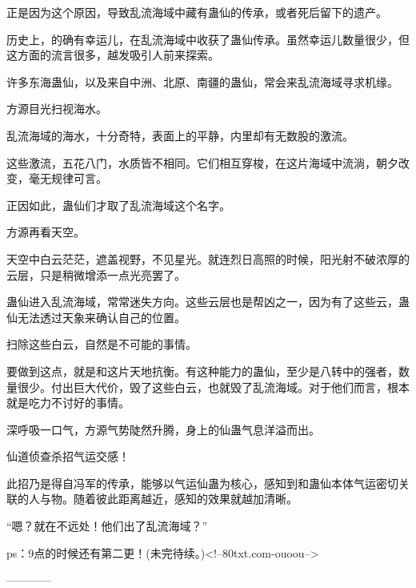 \begin{this_body}
正是因为这个原因，导致乱流海域中藏有蛊仙的传承，或者死后留下的遗产。

历史上，的确有幸运儿，在乱流海域中收获了蛊仙传承。虽然幸运儿数量很少，但这方面的流言很多，越发吸引人前来探索。

许多东海蛊仙，以及来自中洲、北原、南疆的蛊仙，常会来乱流海域寻求机缘。

方源目光扫视海水。

乱流海域的海水，十分奇特，表面上的平静，内里却有无数股的激流。

这些激流，五花八门，水质皆不相同。它们相互穿梭，在这片海域中流淌，朝夕改变，毫无规律可言。

正因如此，蛊仙们才取了乱流海域这个名字。

方源再看天空。

天空中白云茫茫，遮盖视野，不见星光。就连烈日高照的时候，阳光射不破浓厚的云层，只是稍微增添一点光亮罢了。

蛊仙进入乱流海域，常常迷失方向。这些云层也是帮凶之一，因为有了这些云，蛊仙无法透过天象来确认自己的位置。

扫除这些白云，自然是不可能的事情。

要做到这点，就是和这片天地抗衡。有这种能力的蛊仙，至少是八转中的强者，数量很少。付出巨大代价，毁了这些白云，也就毁了乱流海域。对于他们而言，根本就是吃力不讨好的事情。

深呼吸一口气，方源气势陡然升腾，身上的仙蛊气息洋溢而出。

仙道侦查杀招气运交感！

此招乃是得自冯军的传承，能够以气运仙蛊为核心，感知到和蛊仙本体气运密切关联的人与物。随着彼此距离越近，感知的效果就越加清晰。

“嗯？就在不远处！他们出了乱流海域？”

ps：9点的时候还有第二更！(未完待续。)<!--80txt.com-ouoou-->

------------

\end{this_body}

